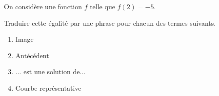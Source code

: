 \begin{exo}{}
	On considère une fonction $f$ telle que $f(2) = -5$.

	Traduire cette égalité par une phrase pour chacun des termes suivants.
	\begin{enumerate}
		\item Image
		\item Antécédent
		\item ... est une solution de...
		\item Courbe représentative
	\end{enumerate}
\end{exo}
